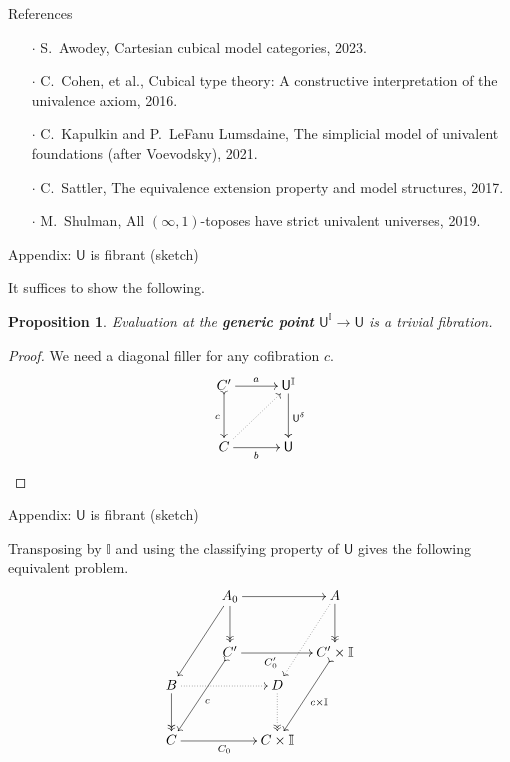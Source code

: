 \documentclass[handout]{beamer}
\newcommand{\myemph}[1]{\textbf{#1}}    %
\newcommand{\U}{\mathsf{U}}
\newcommand{\II}{\mathbb{I}}
\newtheorem{proposition}[theorem]{Proposition}
\theoremstyle{remark}
\begin{document}
%
\begin{frame}{References}

\begin{enumerate}
\item[$\cdot$] S.\ Awodey, Cartesian cubical model categories, 2023.
\smallskip
\item[$\cdot$] C.\ Cohen, et al., Cubical type theory: A constructive interpretation of the univalence axiom, 2016.
\smallskip
\item[$\cdot$] C.\ Kapulkin and P.\ LeFanu Lumsdaine, The simplicial model of univalent foundations (after Voevodsky), 2021.
\smallskip
\item[$\cdot$] C.\ Sattler, The equivalence extension property and model structures, 2017.
\smallskip
\item[$\cdot$] M.\ Shulman, All $(\infty,1)$-toposes have strict univalent universes, 2019.
\end{enumerate}

\end{frame}
\begin{frame}{Appendix: $\U$ is fibrant (sketch)}

It suffices to show the following.
\begin{proposition}
Evaluation at the \myemph{generic point} $\U^\II \to \U$  is a trivial fibration.
\end{proposition}
\pause

\begin{proof}\renewcommand{\qed}{}
We need a diagonal filler for any cofibration $c$.
\begin{equation*}\label{diag:Ufib1}
\xymatrix@=3em{
C' \ar@{>->}[d]_c \ar[r]^{a} & \U^\II \ar[d]^{\U^{\delta}} \\
C  \ar@{..>}[ru] \ar[r]_{b}  & \U  \\
}
\end{equation*}
\end{proof}
\end{frame}
\begin{frame}{Appendix: $\U$ is fibrant (sketch)}

Transposing by $\II$ and using the classifying property of $\U$ gives the following equivalent problem.  
\[
\xymatrix@=1em{
&& \ar[llddd] A_0 \ar@{->>}[dd] \ar[rr]  &&  \ar@{..>}[lddd] A \ar@{->>}[dd] \\
&& && \\
&& \ar@{>->}[llddd]^c C' \ar[rr]_<<<<<<<<{C'_0}  &&  \ar@{>->}[lddd]^{c\times\II} C'\times\II \\
B \ar@{->>}[dd] \ar@{..>}[rrr] &&& D \ar@{..>>}[dd] & \\
&&&& \\
C \ar[rrr]_{C_0} &&& C\times\II &
}
\]

\end{frame}
\end{document}
